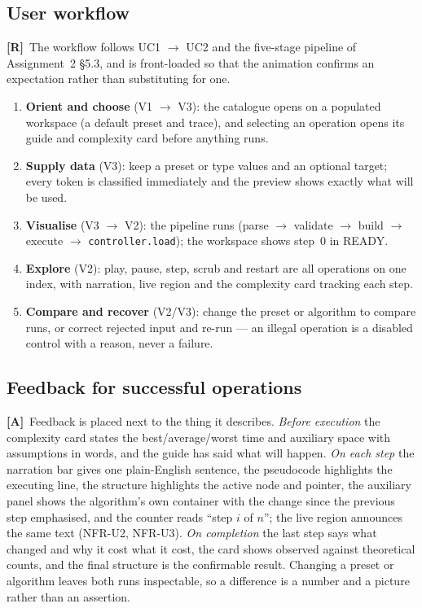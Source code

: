 \documentclass[11pt,a4paper]{article}
\newcommand{\R}{\textcolor{reqc}{\textbf{[R]}}}     %
\newcommand{\A}{\textcolor{asmc}{\textbf{[A]}}}     %
\newcommand{\ct}[1]{\texttt{#1}}
\begin{document}
\subsection{User workflow}

\R\ The workflow follows UC1 $\to$ UC2 and the five-stage pipeline of Assignment~2 \S5.3, and is
front-loaded so that the animation confirms an expectation rather than substituting for one.

\begin{enumerate}[leftmargin=1.6em,topsep=2pt,itemsep=1pt]
  \item \textbf{Orient and choose} (V1 $\to$ V3): the catalogue opens on a populated workspace
        (a default preset and trace), and selecting an operation opens its guide and complexity
        card before anything runs.
  \item \textbf{Supply data} (V3): keep a preset or type values and an optional target; every
        token is classified immediately and the preview shows exactly what will be used.
  \item \textbf{Visualise} (V3 $\to$ V2): the pipeline runs (parse $\to$ validate $\to$ build
        $\to$ execute $\to$ \ct{controller.load}); the workspace shows step~0 in READY.
  \item \textbf{Explore} (V2): play, pause, step, scrub and restart are all operations on one
        index, with narration, live region and the complexity card tracking each step.
  \item \textbf{Compare and recover} (V2/V3): change the preset or algorithm to compare runs,
        or correct rejected input and re-run --- an illegal operation is a disabled control with
        a reason, never a failure.
\end{enumerate}

\subsection{Feedback for successful operations}

\A\ Feedback is placed next to the thing it describes. \emph{Before execution} the complexity
card states the best/average/worst time and auxiliary space with assumptions in words, and the
guide has said what will happen. \emph{On each step} the narration bar gives one plain-English
sentence, the pseudocode highlights the executing line, the structure highlights the active
node and pointer, the auxiliary panel shows the algorithm's own container with the change since
the previous step emphasised, and the counter reads ``step $i$ of $n$''; the live region
announces the same text (NFR-U2, NFR-U3). \emph{On completion} the last step says what changed
and why it cost what it cost, the card shows observed against theoretical counts, and the final
structure is the confirmable result. Changing a preset or algorithm leaves both runs
inspectable, so a difference is a number and a picture rather than an assertion.
\end{document}
